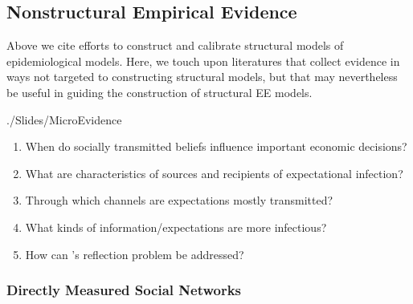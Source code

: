 \hypertarget{microEvidence}{}

\subsection{Nonstructural Empirical Evidence}\label{subsec:microEvidence}



Above we cite efforts to construct and calibrate structural models of epidemiological models.  %
Here, we touch upon literatures that collect evidence in ways not targeted to constructing structural models, but that may nevertheless be useful in guiding the construction of structural EE models.

\begin{verbatimwrite}{./Slides/MicroEvidence}
  \begin{enumerate}
  \item When do socially transmitted beliefs influence important economic decisions?
  \item What are characteristics of sources and recipients of expectational infection?
  \item Through which channels are expectations mostly transmitted?
  \item What kinds of information/expectations are more infectious?
  \item How can \cite{manski1993identification}'s reflection problem be addressed?
  \end{enumerate}
\end{verbatimwrite}


\hypertarget{socialnetworks}{}
\subsubsection{Directly Measured Social Networks}\label{subsubsec:socialnetworks}

